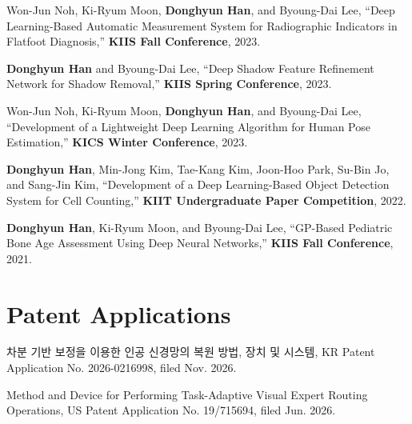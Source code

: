 \documentclass[a4paper,11pt]{article}
\begin{document}
\vspace{2mm}

\noindent
Won-Jun Noh, Ki-Ryum Moon, \textbf{Donghyun Han}, and Byoung-Dai Lee,
``Deep Learning-Based Automatic Measurement System for Radiographic Indicators in Flatfoot Diagnosis,''
\textbf{KIIS Fall Conference}, 2023.

\vspace{2mm}

\noindent
\textbf{Donghyun Han} and Byoung-Dai Lee,
``Deep Shadow Feature Refinement Network for Shadow Removal,''
\textbf{KIIS Spring Conference}, 2023.

\vspace{2mm}

\noindent
Won-Jun Noh, Ki-Ryum Moon, \textbf{Donghyun Han}, and Byoung-Dai Lee,
``Development of a Lightweight Deep Learning Algorithm for Human Pose Estimation,''
\textbf{KICS Winter Conference}, 2023.

\vspace{2mm}

\noindent
\textbf{Donghyun Han}, Min-Jong Kim, Tae-Kang Kim, Joon-Hoo Park, Su-Bin Jo, and Sang-Jin Kim,
``Development of a Deep Learning-Based Object Detection System for Cell Counting,''
\textbf{KIIT Undergraduate Paper Competition}, 2022.

\vspace{2mm}

\noindent
\textbf{Donghyun Han}, Ki-Ryum Moon, and Byoung-Dai Lee,
``GP-Based Pediatric Bone Age Assessment Using Deep Neural Networks,''
\textbf{KIIS Fall Conference}, 2021.


\section{\textbf{Patent Applications}}

\noindent
차분 기반 보정을 이용한 인공 신경망의 복원 방법, 장치 및 시스템,
KR Patent Application No. 2026-0216998, filed Nov. 2026.

\vspace{2mm}

\noindent
Method and Device for Performing Task-Adaptive Visual Expert Routing Operations,
US Patent Application No. 19/715694, filed Jun. 2026.

\vspace{2mm}
\end{document}
